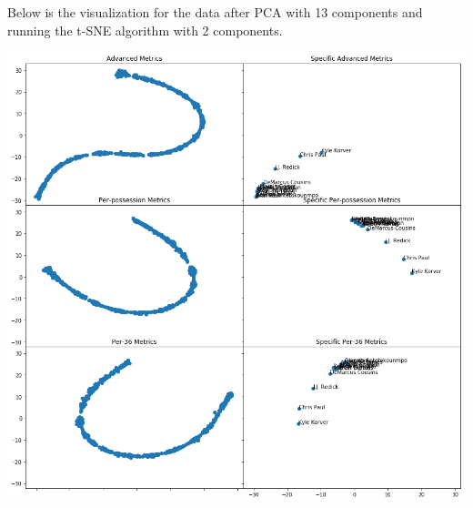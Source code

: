 \documentclass[12pt]{article}
\begin{document}
    Below is the visualization for the data after PCA with 13 components and running the t-SNE algorithm with 2 components.
    \begin{center}
        \includegraphics[scale=0.5]{images/pca-13}
    \end{center}
\end{document}
